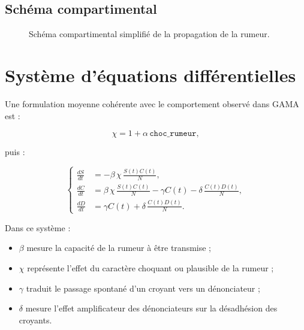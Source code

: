 \documentclass[11pt,a4paper]{article}
\begin{document}
\subsection{Schéma compartimental}

\begin{figure}[H]
\centering
{}
\caption{Schéma compartimental simplifié de la propagation de la rumeur.}
\label{fig:schematic}
\end{figure}

\section{Système d'équations différentielles}

Une formulation moyenne cohérente avec le comportement observé dans GAMA est :

\begin{equation}
\chi = 1 + \alpha\,\texttt{choc\_rumeur},
\end{equation}

puis :

\begin{equation}
\left\{
\begin{aligned}
\frac{dS}{dt} &= -\beta\,\chi\,\frac{S(t)C(t)}{N}, \\
\frac{dC}{dt} &= \beta\,\chi\,\frac{S(t)C(t)}{N} - \gamma C(t) - \delta\,\frac{C(t)D(t)}{N}, \\
\frac{dD}{dt} &= \gamma C(t) + \delta\,\frac{C(t)D(t)}{N}.
\end{aligned}
\right.
\label{eq:systeme}
\end{equation}

Dans ce système :

\begin{itemize}
  \item $\beta$ mesure la capacité de la rumeur à être transmise ;
  \item $\chi$ représente l'effet du caractère choquant ou plausible de la rumeur ;
  \item $\gamma$ traduit le passage spontané d'un croyant vers un dénonciateur ;
  \item $\delta$ mesure l'effet amplificateur des dénonciateurs sur la désadhésion des croyants.
\end{itemize}
\end{document}
